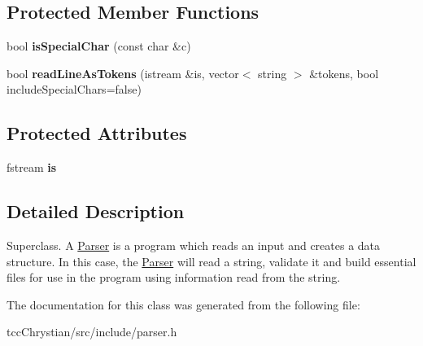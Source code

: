 \subsection*{Protected Member Functions}
\begin{DoxyCompactItemize}
\item 
\hypertarget{classParser_a83c7ac58f2c98cc54e9c750b29e6b0f0}{bool {\bfseries is\-Special\-Char} (const char \&c)}\label{classParser_a83c7ac58f2c98cc54e9c750b29e6b0f0}

\item 
\hypertarget{classParser_ae42067f51acd49ccccb0b0373321a421}{bool {\bfseries read\-Line\-As\-Tokens} (istream \&is, vector$<$ string $>$ \&tokens, bool include\-Special\-Chars=false)}\label{classParser_ae42067f51acd49ccccb0b0373321a421}

\end{DoxyCompactItemize}
\subsection*{Protected Attributes}
\begin{DoxyCompactItemize}
\item 
\hypertarget{classParser_a74c323dd4798b459fa982295b8e871bc}{fstream {\bfseries is}}\label{classParser_a74c323dd4798b459fa982295b8e871bc}

\end{DoxyCompactItemize}


\subsection{Detailed Description}
Superclass. A \hyperlink{classParser}{Parser} is a program which reads an input and creates a data structure. In this case, the \hyperlink{classParser}{Parser} will read a string, validate it and build essential files for use in the program using information read from the string. 

The documentation for this class was generated from the following file\-:\begin{DoxyCompactItemize}
\item 
tcc\-Chrystian/src/include/parser.\-h\end{DoxyCompactItemize}
